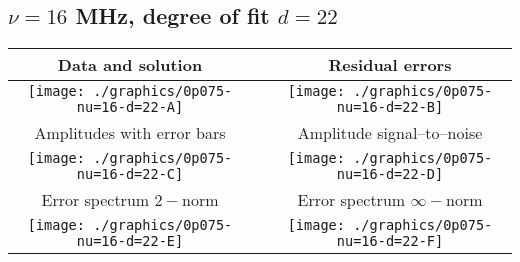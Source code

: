 

% 

\clearpage{}
\break{}

\subsection{$\nu = 16$ MHz, degree of fit $d = 22$}

\begin{table}[h]
    \begin{center}
        \begin{tabular}{ccc}
            Data and solution & \quad & Residual errors \\\hline
            \texttt{[image: ./graphics/0p075-nu=16-d=22-A]} &&
            \texttt{[image: ./graphics/0p075-nu=16-d=22-B]} \\[15pt]
            Amplitudes with error bars && Amplitude signal--to--noise \\\hline
            \texttt{[image: ./graphics/0p075-nu=16-d=22-C]} &&
            \texttt{[image: ./graphics/0p075-nu=16-d=22-D]} \\[15pt]
            Error spectrum $2-$norm && Error spectrum $\infty-$norm \\\hline
            \texttt{[image: ./graphics/0p075-nu=16-d=22-E]} &&
            \texttt{[image: ./graphics/0p075-nu=16-d=22-F]} \\[15pt]
        \end{tabular}
    \end{center}
\label{fig:elev=75, nu=16}
\end{table}



\endinput
